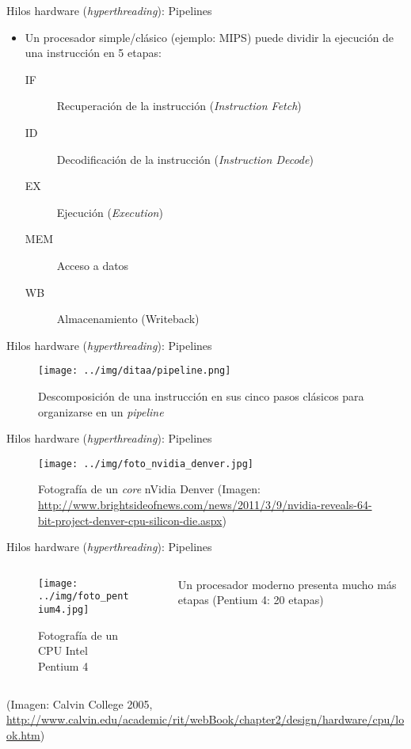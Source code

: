 \documentclass[presentation]{beamer}
\begin{document}
\begin{frame}[label={sec:org67f7024}]{Hilos hardware (\emph{hyperthreading}): Pipelines}
\begin{itemize}
\item Un procesador simple/clásico (ejemplo: MIPS) puede dividir la
ejecución de una instrucción en 5 etapas:
\begin{description}
\item[{IF}] Recuperación de la instrucción (\emph{Instruction Fetch})
\item[{ID}] Decodificación de la instrucción (\emph{Instruction Decode})
\item[{EX}] Ejecución (\emph{Execution})
\item[{MEM}] Acceso a datos
\item[{WB}] Almacenamiento (Writeback)
\end{description}
\end{itemize}
\end{frame}

\begin{frame}[label={sec:orgd098cb1}]{Hilos hardware (\emph{hyperthreading}): Pipelines}
\begin{figure}[htbp]
\centering
\texttt{[image: ../img/ditaa/pipeline.png]}
\caption{Descomposición de una instrucción en sus cinco pasos clásicos para organizarse en un \emph{pipeline}}
\end{figure}
\end{frame}

\begin{frame}[label={sec:orgde26cf7}]{Hilos hardware (\emph{hyperthreading}): Pipelines}
\begin{figure}[htbp]
\centering
\texttt{[image: ../img/foto\_nvidia\_denver.jpg]}
\caption{Fotografía de un \emph{core} nVidia Denver (Imagen: \url{http://www.brightsideofnews.com/news/2011/3/9/nvidia-reveals-64-bit-project-denver-cpu-silicon-die.aspx})}
\end{figure}
\end{frame}

\begin{frame}[label={sec:org6bcfff6}]{Hilos hardware (\emph{hyperthreading}): Pipelines}
\begin{columns}\begin{column}{0.7\textwidth}
\begin{figure}[htbp]
\centering
\texttt{[image: ../img/foto\_pentium4.jpg]}
\caption{Fotografía de un CPU Intel Pentium 4}
\end{figure}
\end{column}\begin{column}{0.3\textwidth}
Un procesador moderno presenta mucho más etapas (Pentium 4: 20 etapas)
\end{column}\end{columns}
\begin{center}
\scriptsize
(Imagen: Calvin College 2005, \url{http://www.calvin.edu/academic/rit/webBook/chapter2/design/hardware/cpu/look.htm})
\end{center}
\end{frame}
\end{document}
